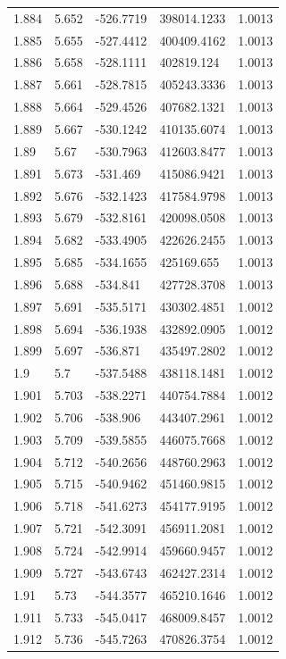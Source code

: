 \begin{tabular}{lllll}
1.884 & 5.652 & -526.7719 & 398014.1233 & 1.0013 \\
1.885 & 5.655 & -527.4412 & 400409.4162 & 1.0013 \\
1.886 & 5.658 & -528.1111 & 402819.124 & 1.0013 \\
1.887 & 5.661 & -528.7815 & 405243.3336 & 1.0013 \\
1.888 & 5.664 & -529.4526 & 407682.1321 & 1.0013 \\
1.889 & 5.667 & -530.1242 & 410135.6074 & 1.0013 \\
1.89 & 5.67 & -530.7963 & 412603.8477 & 1.0013 \\
1.891 & 5.673 & -531.469 & 415086.9421 & 1.0013 \\
1.892 & 5.676 & -532.1423 & 417584.9798 & 1.0013 \\
1.893 & 5.679 & -532.8161 & 420098.0508 & 1.0013 \\
1.894 & 5.682 & -533.4905 & 422626.2455 & 1.0013 \\
1.895 & 5.685 & -534.1655 & 425169.655 & 1.0013 \\
1.896 & 5.688 & -534.841 & 427728.3708 & 1.0013 \\
1.897 & 5.691 & -535.5171 & 430302.4851 & 1.0012 \\
1.898 & 5.694 & -536.1938 & 432892.0905 & 1.0012 \\
1.899 & 5.697 & -536.871 & 435497.2802 & 1.0012 \\
1.9 & 5.7 & -537.5488 & 438118.1481 & 1.0012 \\
1.901 & 5.703 & -538.2271 & 440754.7884 & 1.0012 \\
1.902 & 5.706 & -538.906 & 443407.2961 & 1.0012 \\
1.903 & 5.709 & -539.5855 & 446075.7668 & 1.0012 \\
1.904 & 5.712 & -540.2656 & 448760.2963 & 1.0012 \\
1.905 & 5.715 & -540.9462 & 451460.9815 & 1.0012 \\
1.906 & 5.718 & -541.6273 & 454177.9195 & 1.0012 \\
1.907 & 5.721 & -542.3091 & 456911.2081 & 1.0012 \\
1.908 & 5.724 & -542.9914 & 459660.9457 & 1.0012 \\
1.909 & 5.727 & -543.6743 & 462427.2314 & 1.0012 \\
1.91 & 5.73 & -544.3577 & 465210.1646 & 1.0012 \\
1.911 & 5.733 & -545.0417 & 468009.8457 & 1.0012 \\
1.912 & 5.736 & -545.7263 & 470826.3754 & 1.0012 \\

\end{tabular}
